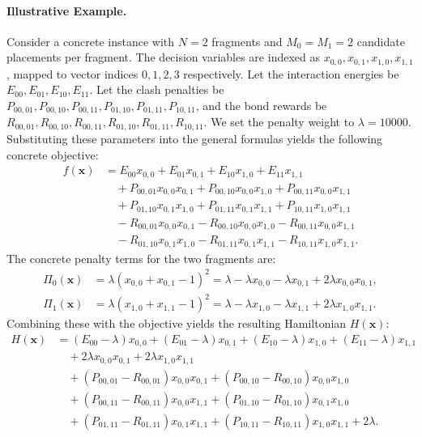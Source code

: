 \documentclass[12pt]{article}
\begin{document}
\paragraph{Illustrative Example.}
Consider a concrete instance with $N=2$ fragments and $M_0 = M_1 = 2$ candidate placements per fragment. The decision variables are indexed as $x_{0,0}, x_{0,1}, x_{1,0}, x_{1,1}$, mapped to vector indices $0, 1, 2, 3$ respectively. Let the interaction energies be $E_{00}, E_{01}, E_{10}, E_{11}$. Let the clash penalties be $P_{00,01}, P_{00,10}, P_{00,11}, P_{01,10}, P_{01,11}, P_{10,11}$, and the bond rewards be $R_{00,01}, R_{00,10}, R_{00,11}, R_{01,10}, R_{01,11}, R_{10,11}$. We set the penalty weight to $\lambda = 10000$.
Substituting these parameters into the general formulas yields the following concrete objective:
\begin{align}
  f(\mathbf{x}) &= E_{00}x_{0,0} + E_{01}x_{0,1} + E_{10}x_{1,0} + E_{11}x_{1,1} \nonumber \\
  &\quad + P_{00,01}x_{0,0}x_{0,1} + P_{00,10}x_{0,0}x_{1,0} + P_{00,11}x_{0,0}x_{1,1} \nonumber \\
  &\quad + P_{01,10}x_{0,1}x_{1,0} + P_{01,11}x_{0,1}x_{1,1} + P_{10,11}x_{1,0}x_{1,1} \nonumber \\
  &\quad - R_{00,01}x_{0,0}x_{0,1} - R_{00,10}x_{0,0}x_{1,0} - R_{00,11}x_{0,0}x_{1,1} \nonumber \\
  &\quad - R_{01,10}x_{0,1}x_{1,0} - R_{01,11}x_{0,1}x_{1,1} - R_{10,11}x_{1,0}x_{1,1}.
\end{align}
The concrete penalty terms for the two fragments are:
\begin{align}
  \Pi_0(\mathbf{x}) &= \lambda(x_{0,0} + x_{0,1} - 1)^2 = \lambda - \lambda x_{0,0} - \lambda x_{0,1} + 2\lambda x_{0,0}x_{0,1}, \\
  \Pi_1(\mathbf{x}) &= \lambda(x_{1,0} + x_{1,1} - 1)^2 = \lambda - \lambda x_{1,0} - \lambda x_{1,1} + 2\lambda x_{1,0}x_{1,1}.
\end{align}
Combining these with the objective yields the resulting Hamiltonian $H(\mathbf{x})$:
\begin{align}
  H(\mathbf{x}) &= (E_{00} - \lambda)x_{0,0} + (E_{01} - \lambda)x_{0,1} + (E_{10} - \lambda)x_{1,0} + (E_{11} - \lambda)x_{1,1} \nonumber \\
  &\quad + 2\lambda x_{0,0}x_{0,1} + 2\lambda x_{1,0}x_{1,1} \nonumber \\
  &\quad + (P_{00,01} - R_{00,01})x_{0,0}x_{0,1} + (P_{00,10} - R_{00,10})x_{0,0}x_{1,0} \nonumber \\
  &\quad + (P_{00,11} - R_{00,11})x_{0,0}x_{1,1} + (P_{01,10} - R_{01,10})x_{0,1}x_{1,0} \nonumber \\
  &\quad + (P_{01,11} - R_{01,11})x_{0,1}x_{1,1} + (P_{10,11} - R_{10,11})x_{1,0}x_{1,1} + 2\lambda.
\end{align}
\end{document}
